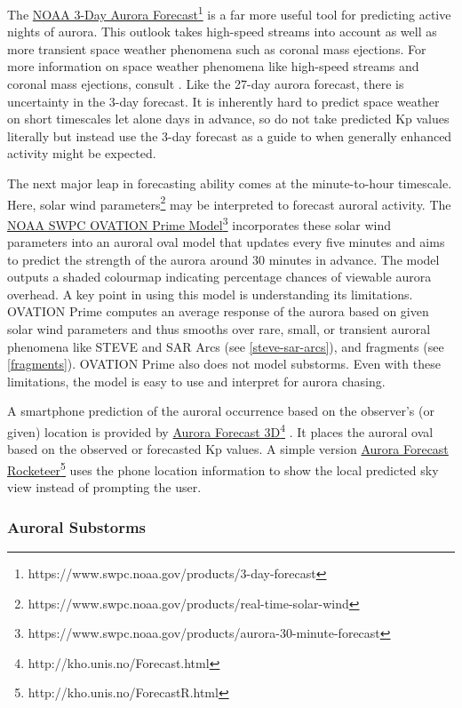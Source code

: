 \documentclass{article}
\renewcommand{\cite}[1]{\parencite{#1}}
\begin{document}
The \href{https://www.swpc.noaa.gov/products/3-day-forecast}{NOAA 3-Day Aurora Forecast}\footnote{https://www.swpc.noaa.gov/products/3-day-forecast} is a far more useful tool for predicting active nights of aurora. This outlook takes high-speed streams into account as well as more transient space weather phenomena such as coronal mass ejections. For more information on space weather phenomena like high-speed streams and coronal mass ejections, consult \cite{Ledvina2022}. Like the 27-day aurora forecast, there is uncertainty in the 3-day forecast. It is inherently hard to predict space weather on short timescales let alone days in advance, so do not take predicted Kp values literally but instead use the 3-day forecast as a guide to when generally enhanced activity might be expected.

The next major leap in forecasting ability comes at the minute-to-hour timescale. Here, solar wind parameters\footnote{https://www.swpc.noaa.gov/products/real-time-solar-wind} may be interpreted to forecast auroral activity. The \href{https://www.swpc.noaa.gov/products/aurora-30-minute-forecast}{NOAA SWPC OVATION Prime Model}\footnote{https://www.swpc.noaa.gov/products/aurora-30-minute-forecast} \cite{Newell2014} incorporates these solar wind parameters into an auroral oval model that updates every five minutes and aims to predict the strength of the aurora around 30 minutes in advance. The model outputs a shaded colourmap indicating percentage chances of viewable aurora overhead. A key point in using this model is understanding its limitations. OVATION Prime computes an average response of the aurora based on given solar wind parameters and thus smooths over rare, small, or transient auroral phenomena like STEVE and SAR Arcs (see \ref{steve-sar-arcs}), and fragments (see \ref{fragments}). OVATION Prime also does not model substorms. Even with these limitations, the model is easy to use and interpret for aurora chasing.

A smartphone prediction of the auroral occurrence based on the observer's (or given) location is provided by \href{http://kho.unis.no/Forecast.html}{Aurora Forecast 3D}\footnote{http://kho.unis.no/Forecast.html} \cite{Sigernes2011}. It places the auroral oval based on the observed or forecasted Kp values. A simple version \href{http://kho.unis.no/ForecastR.html}{Aurora Forecast Rocketeer}\footnote{http://kho.unis.no/ForecastR.html} uses the phone location information to show the local predicted sky view instead of prompting the user.

\subsubsection{Auroral Substorms}
\label{auroral-substorms}
\end{document}
